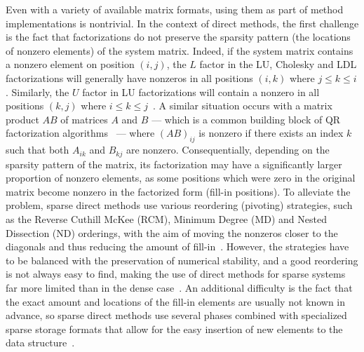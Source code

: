 Even with a variety of available matrix formats, using them as part of method
implementations is nontrivial. In the context of direct methods, the first
challenge is the fact that factorizations do not preserve the sparsity pattern
(\ie the locations of nonzero elements) of the system matrix. Indeed, if the
system matrix contains a nonzero element on position $(i, j)$, the $L$
factor in the LU, Cholesky and LDL factorizations will generally have nonzeros
in all positions $(i, k)$ where $j \leq k \leq i$. Similarly, the $U$ factor in
LU factorizations will contain a nonzero in all positions $(k, j)$ where $i
\leq k \leq j$~\cite{duff}. A similar situation occurs with a matrix product
$AB$ of matrices $A$ and $B$ --- which is a common building block of QR
factorization algorithms~\cite{demmel} --- where $(AB)_{ij}$ is nonzero if there
exists an index $k$ such that both $A_{ik}$ and $B_{kj}$ are nonzero.
Consequentially, depending on the sparsity pattern of the matrix, its
factorization may have a significantly larger proportion of nonzero elements, as
some positions which were zero in the original matrix become nonzero in the
factorized form (fill-in positions). To alleviate the problem, sparse direct
methods use various reordering (pivoting) strategies, such as the Reverse
Cuthill McKee (RCM), Minimum Degree (MD) and Nested Dissection (ND) orderings,
with the aim of moving the nonzeros closer to the diagonals and thus reducing
the amount of fill-in~\cite{saad, duff}. However, the strategies have to be
balanced with the preservation of numerical stability, and a good reordering is
not always easy to find, making the use of direct methods for sparse systems far
more limited than in the dense case~\cite{saad, duff}. An additional difficulty
is the fact that the exact amount and locations of the fill-in elements are
usually not known in advance, so sparse direct methods use several phases
combined with specialized sparse storage formats that allow for the easy
insertion of new elements to the data structure~\cite{saad, duff}.

